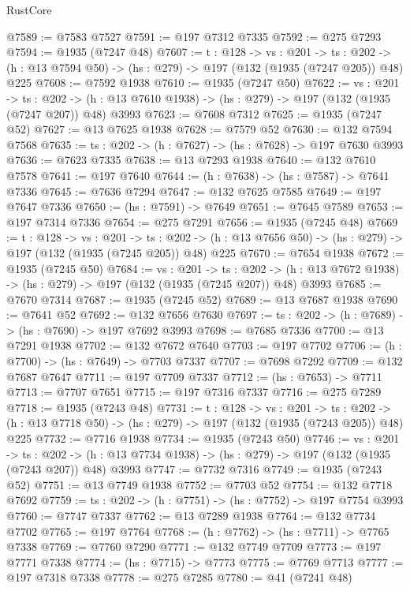 \begin{lexlean}{RustCore}
\begin{coremodule}
@7589 := @7583 @7527
@7591 := @197 @7312 @7335
@7592 := @275 @7293
@7594 := @1935 (@7247 @48)
@7607 := {t : @128} ->
  {vs : @201} ->
  {ts : @202} -> (h : @13 @7594 @50) -> (hs : @279) -> @197 (@132 (@1935 (@7247 @205)) @48) @225
@7608 := @7592 @1938
@7610 := @1935 (@7247 @50)
@7622 := {vs : @201} ->
  {ts : @202} -> (h : @13 @7610 @1938) -> (hs : @279) -> @197 (@132 (@1935 (@7247 @207)) @48) @3993
@7623 := @7608 @7312
@7625 := @1935 (@7247 @52)
@7627 := @13 @7625 @1938
@7628 := @7579 @52
@7630 := @132 @7594 @7568
@7635 := {ts : @202} -> (h : @7627) -> (hs : @7628) -> @197 @7630 @3993
@7636 := @7623 @7335
@7638 := @13 @7293 @1938
@7640 := @132 @7610 @7578
@7641 := @197 @7640
@7644 := (h : @7638) -> (hs : @7587) -> @7641 @7336
@7645 := @7636 @7294
@7647 := @132 @7625 @7585
@7649 := @197 @7647 @7336
@7650 := (hs : @7591) -> @7649
@7651 := @7645 @7589
@7653 := @197 @7314 @7336
@7654 := @275 @7291
@7656 := @1935 (@7245 @48)
@7669 := {t : @128} ->
  {vs : @201} ->
  {ts : @202} -> (h : @13 @7656 @50) -> (hs : @279) -> @197 (@132 (@1935 (@7245 @205)) @48) @225
@7670 := @7654 @1938
@7672 := @1935 (@7245 @50)
@7684 := {vs : @201} ->
  {ts : @202} -> (h : @13 @7672 @1938) -> (hs : @279) -> @197 (@132 (@1935 (@7245 @207)) @48) @3993
@7685 := @7670 @7314
@7687 := @1935 (@7245 @52)
@7689 := @13 @7687 @1938
@7690 := @7641 @52
@7692 := @132 @7656 @7630
@7697 := {ts : @202} -> (h : @7689) -> (hs : @7690) -> @197 @7692 @3993
@7698 := @7685 @7336
@7700 := @13 @7291 @1938
@7702 := @132 @7672 @7640
@7703 := @197 @7702
@7706 := (h : @7700) -> (hs : @7649) -> @7703 @7337
@7707 := @7698 @7292
@7709 := @132 @7687 @7647
@7711 := @197 @7709 @7337
@7712 := (hs : @7653) -> @7711
@7713 := @7707 @7651
@7715 := @197 @7316 @7337
@7716 := @275 @7289
@7718 := @1935 (@7243 @48)
@7731 := {t : @128} ->
  {vs : @201} ->
  {ts : @202} -> (h : @13 @7718 @50) -> (hs : @279) -> @197 (@132 (@1935 (@7243 @205)) @48) @225
@7732 := @7716 @1938
@7734 := @1935 (@7243 @50)
@7746 := {vs : @201} ->
  {ts : @202} -> (h : @13 @7734 @1938) -> (hs : @279) -> @197 (@132 (@1935 (@7243 @207)) @48) @3993
@7747 := @7732 @7316
@7749 := @1935 (@7243 @52)
@7751 := @13 @7749 @1938
@7752 := @7703 @52
@7754 := @132 @7718 @7692
@7759 := {ts : @202} -> (h : @7751) -> (hs : @7752) -> @197 @7754 @3993
@7760 := @7747 @7337
@7762 := @13 @7289 @1938
@7764 := @132 @7734 @7702
@7765 := @197 @7764
@7768 := (h : @7762) -> (hs : @7711) -> @7765 @7338
@7769 := @7760 @7290
@7771 := @132 @7749 @7709
@7773 := @197 @7771 @7338
@7774 := (hs : @7715) -> @7773
@7775 := @7769 @7713
@7777 := @197 @7318 @7338
@7778 := @275 @7285
@7780 := @41 (@7241 @48)

\end{coremodule}
\end{lexlean}
